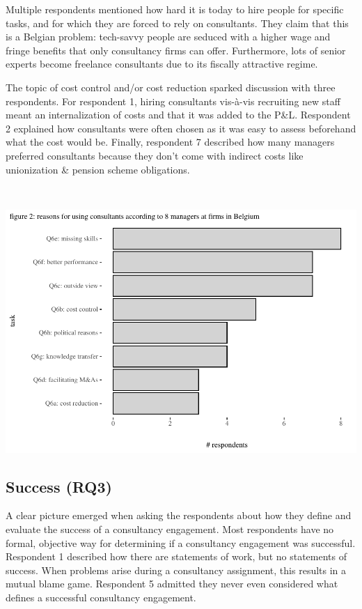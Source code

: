 \documentclass[12pt]{article}
\begin{document}
Multiple respondents mentioned how hard it is today to hire people for
specific tasks, and for which they are forced to rely on consultants.
They claim that this is a Belgian problem: tech-savvy people are seduced
with a higher wage and fringe benefits that only consultancy firms can
offer. Furthermore, lots of senior experts become freelance consultants
due to its fiscally attractive regime.

The topic of cost control and/or cost reduction sparked discussion with
three respondents. For respondent 1, hiring consultants vis-à-vis
recruiting new staff meant an internalization of costs and that it was
added to the P\&L. Respondent 2 explained how consultants were often
chosen as it was easy to assess beforehand what the cost would be.
Finally, respondent 7 described how many managers preferred consultants
because they don't come with indirect costs like unionization \& pension
scheme obligations.

\(~\)

\begin{center}\includegraphics[width=0.75\linewidth]{2_ams_five_pager_files/figure-latex/unnamed-chunk-4-1} \end{center}

\subsection{Success (RQ3)}\label{success-rq3}

A clear picture emerged when asking the respondents about how they
define and evaluate the success of a consultancy engagement. Most
respondents have no formal, objective way for determining if a
consultancy engagement was successful. Respondent 1 described how there
are statements of work, but no statements of success. When problems
arise during a consultancy assignment, this results in a mutual blame
game. Respondent 5 admitted they never even considered what defines a
successful consultancy engagement.
\end{document}
